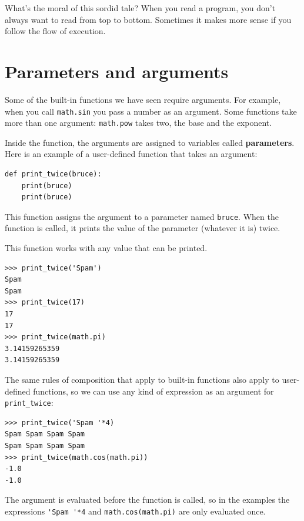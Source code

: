 \documentclass[10pt]{book}
\begin{document}
What's the moral of this sordid tale?  When you read a program, you
don't always want to read from top to bottom.  Sometimes it makes
more sense if you follow the flow of execution.


\section{Parameters and arguments}
\label{parameters}

Some of the built-in functions we have seen require arguments.  For
example, when you call {\tt math.sin} you pass a number
as an argument.  Some functions take more than one argument:
{\tt math.pow} takes two, the base and the exponent.

Inside the function, the arguments are assigned to
variables called {\bf parameters}.  Here is an example of a
user-defined function that takes an argument:


\beforeverb
\begin{verbatim}
def print_twice(bruce):
    print(bruce)
    print(bruce)
\end{verbatim}
\afterverb
%
This function assigns the argument to a parameter
named {\tt bruce}.  When the function is called, it prints the value of
the parameter (whatever it is) twice.

This function works with any value that can be printed.

\beforeverb
\begin{verbatim}
>>> print_twice('Spam')
Spam
Spam
>>> print_twice(17)
17
17
>>> print_twice(math.pi)
3.14159265359
3.14159265359
\end{verbatim}
\afterverb
%
The same rules of composition that apply to built-in functions also
apply to user-defined functions, so we can use any kind of expression
as an argument for \verb"print_twice":


\beforeverb
\begin{verbatim}
>>> print_twice('Spam '*4)
Spam Spam Spam Spam
Spam Spam Spam Spam
>>> print_twice(math.cos(math.pi))
-1.0
-1.0
\end{verbatim}
\afterverb
%
The argument is evaluated before the function is called, so
in the examples the expressions \verb"'Spam '*4" and
{\tt math.cos(math.pi)} are only evaluated once.

\end{document}
